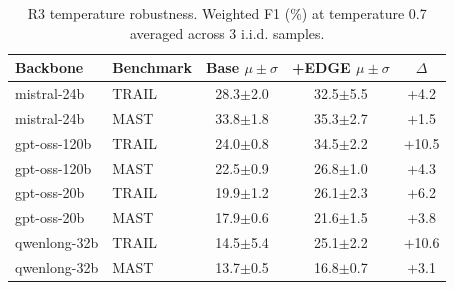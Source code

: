 \begin{table}[!tbp]
\centering \footnotesize
\begin{tabular}{l l c c c}
\toprule
\textbf{Backbone} & \textbf{Benchmark} & Base $\mu\pm\sigma$ & +EDGE $\mu\pm\sigma$ & $\Delta$ \\
\midrule
mistral-24b & TRAIL & 28.3$\pm$2.0 & 32.5$\pm$5.5 & +4.2 \\
mistral-24b & MAST & 33.8$\pm$1.8 & 35.3$\pm$2.7 & +1.5 \\
gpt-oss-120b & TRAIL & 24.0$\pm$0.8 & 34.5$\pm$2.2 & +10.5 \\
gpt-oss-120b & MAST & 22.5$\pm$0.9 & 26.8$\pm$1.0 & +4.3 \\
gpt-oss-20b & TRAIL & 19.9$\pm$1.2 & 26.1$\pm$2.3 & +6.2 \\
gpt-oss-20b & MAST & 17.9$\pm$0.6 & 21.6$\pm$1.5 & +3.8 \\
qwenlong-32b & TRAIL & 14.5$\pm$5.4 & 25.1$\pm$2.2 & +10.6 \\
qwenlong-32b & MAST & 13.7$\pm$0.5 & 16.8$\pm$0.7 & +3.1 \\
\bottomrule
\end{tabular}
\caption{R3 temperature robustness. Weighted F1 (\%) at temperature 0.7 averaged across 3 i.i.d. samples.}
\label{tab:r3_temperature}
\end{table}
